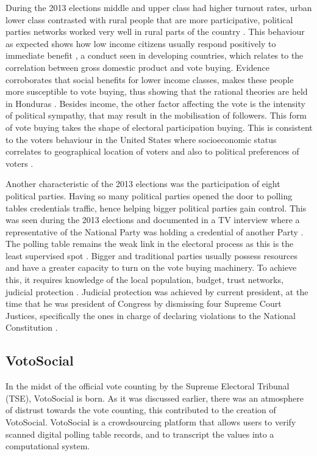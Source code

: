 \documentclass[letterpaper,10pt]{article}
\begin{document}
During the 2013 elections middle and upper class had higher turnout rates, urban lower class contrasted with rural people that are more participative, political parties networks worked very well in rural parts of the country \citep{romero2014}. This behaviour as expected shows how low income citizens usually respond positively to immediate benefit \citep{kit2000}, a conduct seen in developing countries, which relates to the correlation between gross domestic product and vote buying. Evidence corroborates that social benefits for lower income classes, makes these people more susceptible to vote buying, thus showing that the rational theories are held in Honduras \citep{gonza2014}. Besides income, the other factor affecting the vote is the intensity of political sympathy, that may result in the mobilisation of followers. This form of vote buying takes the shape of electoral participation buying. This is consistent to the voters behaviour in the United States where socioeconomic status correlates to geographical location of voters and also to political preferences of voters \citep{osborn2010}.

Another characteristic of the 2013 elections was the participation of eight political parties. Having so many political parties opened the door to polling tables credentials traffic, hence helping bigger political parties gain control. This was seen during the 2013 elections and documented in a TV interview where a representative of the National Party was holding a credential of another Party \citep{vidap}. The polling table remains the weak link in the electoral process as this is the least supervised spot \citep{romero2014}. Bigger and traditional parties usually possess resources and have a greater capacity to turn on the vote buying machinery. To achieve this, it requires knowledge of the local population, budget, trust networks, judicial protection \citep{gonza2014}. Judicial protection was achieved by current president, at the time that he was president of Congress by dismissing four Supreme Court Justices, specifically the ones in charge of declaring violations to the National Constitution \citep{csj2012}.

\subsection{VotoSocial}

In the midst of the official vote counting by the Supreme Electoral Tribunal (TSE), VotoSocial is born. As it was discussed earlier, there was an atmosphere of distrust towards the vote counting, this contributed to the creation of VotoSocial. VotoSocial is a crowdsourcing platform that allows users to verify scanned digital polling table records, and to transcript the values into a computational system. 
\end{document}

